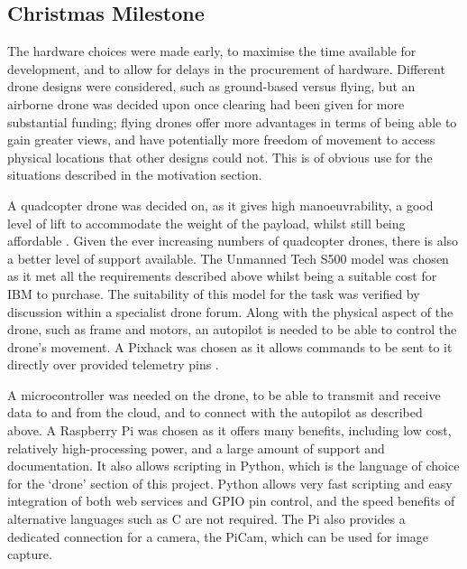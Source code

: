 \documentclass{article}
\begin{document}
\subsection{Christmas Milestone}
The hardware choices were made early, to maximise the time available for development, and to allow for delays in the procurement of hardware. Different drone designs were considered, such as ground-based versus flying, but an airborne drone was decided upon once clearing had been given for more substantial funding; flying drones offer more advantages in terms of being able to gain greater views, and have potentially more freedom of movement to access physical locations that other designs could not. This is of obvious use for the situations described in the motivation section.

\vspace{\baselineskip} \noindent
A quadcopter drone was decided on, as it gives high manoeuvrability, a good level of lift to accommodate the weight of the payload, whilst still being affordable \cite{UAVDevelopment}. Given the ever increasing numbers of quadcopter drones, there is also a better level of support available. The Unmanned Tech S500 model was chosen as it met all the requirements described above whilst being a suitable cost for IBM to purchase. The suitability of this model for the task was verified by discussion within a specialist drone forum. Along with the physical aspect of the drone, such as frame and motors, an autopilot is needed to be able to control the drone's movement. A Pixhack was chosen as it allows commands to be sent to it directly over provided telemetry pins \cite{Mavlink}.

\vspace{\baselineskip} \noindent
A microcontroller was needed on the drone, to be able to transmit and receive data to and from the cloud, and to connect with the autopilot as described above. A Raspberry Pi was chosen as it offers many benefits, including low cost, relatively high-processing power, and a large amount of support and documentation. It also allows scripting in Python, which is the language of choice for the `drone' section of this project. Python allows very fast scripting and easy integration of both web services and GPIO pin control, and the speed benefits of alternative languages such as C are not required. The Pi also provides a dedicated connection for a camera, the PiCam, which can be used for image capture.
\end{document}
